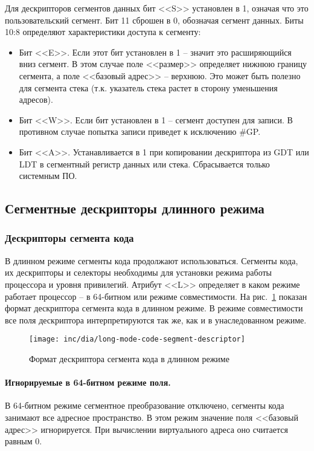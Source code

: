 Для дескрипторов сегментов данных бит <<S>> установлен в 1, означая что это пользовательский сегмент. Бит 11
сброшен в 0, обозначая сегмент данных. Биты 10:8 определяют характеристики доступа к сегменту:
\begin{itemize}
	\item Бит <<E>>. Если этот бит установлен в 1 -- значит это расширяющийся вниз сегмент. В этом случае
		поле <<размер>> определяет нижнюю границу сегмента, а поле <<базовый адрес>> -- верхнюю.
		Это может быть полезно для сегмента стека (т.к. указатель стека растет в сторону уменьшения адресов).
	\item Бит <<W>>. Если бит установлен в 1 -- сегмент доступен для записи. В противном случае попытка записи
		приведет к исключению \#GP.
	\item Бит <<A>>. Устанавливается в 1 при копировании дескриптора из GDT или LDT в сегментный регистр данных или стека.
		Сбрасывается только системным ПО.
\end{itemize}

\subsection{Сегментные дескрипторы длинного режима}
\subsubsection*{Дескрипторы сегмента кода}
В длинном режиме сегменты кода продолжают использоваться. Сегменты кода, их дескрипторы и селекторы
необходимы для установки режима работы процессора и уровня привилегий. Атрибут <<L>> определяет в
каком режиме работает процессор -- в 64-битном или режиме совместимости.
На рис.~\ref{fig:long-mode-code-segment-descriptor-format} показан формат дескриптора сегмента кода
в длинном режиме. В режиме совместимости все поля дескриптора интерпретируются так же, как и в унаследованном режиме.

\begin{figure}[ht!]
  \centering
  \texttt{[image: inc/dia/long-mode-code-segment-descriptor]}
  \caption{Формат дескриптора сегмента кода в длинном режиме}
  \label{fig:long-mode-code-segment-descriptor-format}
\end{figure}

\paragraph{Игнорируемые в 64-битном режиме поля.}
В 64-битном режиме сегментное преобразование отключено, сегменты кода занимают все адресное пространство.
В этом режим значение поля <<базовый адрес>> игнорируется. При вычислении виртуального адреса оно считается равным 0.

